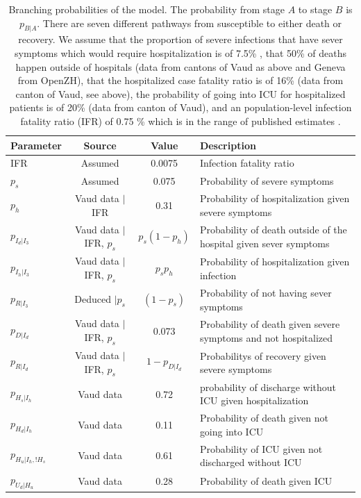 \begin{table}[ht!]
\centering
\caption[Branching probabilities of the model]{Branching probabilities of the model. The probability from stage $A$ to stage $B$ is $p_{B|A}$. There are seven different pathways from susceptible to either death or recovery. We assume that the proportion of severe infections that have sever symptoms which would require hospitalization is of 7.5\% \parencite{Verity:EstimatesSeverityCoronavirus:2020}, that 50\% of deaths happen outside of hospitals (data from cantons of Vaud as above and Geneva from OpenZH), that the hospitalized case fatality ratio is of 16\% (data from canton of Vaud, see above), the probability of going into ICU for hospitalized patients is of 20\% (data from canton of Vaud), and an population-level infection fatality ratio (IFR) of 0.75 \% which is in the range of published estimates \parencite{Verity:EstimatesSeverityCoronavirus:2020,Russell:EstimatingInfectionCase:2020}.
}

\begin{tabular}{lccl}
\toprule
Parameter & Source & Value &  Description \\
\midrule
IFR & Assumed & 0.0075 & Infection fatality ratio \\
$p_s$ & Assumed &  0.075 & Probability of severe symptoms\\
$p_h$ &  Vaud data $|$ IFR &  0.31 & Probability of hospitalization given severe symptoms  \\
$p_{I_d|I_3}$ & Vaud data $|$ IFR, $p_s$ & $p_s (1-p_h)$&  Probability of death outside of the hospital given sever symptoms  \\
$p_{I_h|I_3}$ & Vaud data $|$ IFR, $p_s$  & $p_s p_h$   &  Probability of hospitalization given infection \\
$p_{R|I_3}$   & Deduced  $|p_s$ & $(1-p_s)$    &  Probability of not having sever symptoms\\
$p_{D|I_d}$   & Vaud data $|$ IFR, $p_s$  &  0.073   &  Probability of death given severe symptoms and not hospitalized \\
$p_{R|I_d}$   & Vaud data $|$ IFR, $p_s$ &  $1-p_{D|I_d}$   & Probabilitys of recovery given severe symptoms \\
$p_{H_s|I_h}$ & Vaud data &  0.72   &  probability of discharge without ICU given hospitalization\\
$p_{H_d|I_h}$ & Vaud data &  0.11    &  Probability of death given not going into ICU\\
$p_{H_u|I_h, !H_s}$ & Vaud data &  0.61   &  Probability of ICU given not discharged without ICU\\
$p_{U_d|H_u}$ & Vaud data & 0.28   &  Probability of death given ICU \\
\bottomrule
\end{tabular}
\label{parProb}
\end{table}

